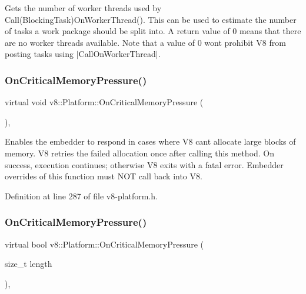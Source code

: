 Gets the number of worker threads used by Call(\+Blocking\+Task)On\+Worker\+Thread(). This can be used to estimate the number of tasks a work package should be split into. A return value of 0 means that there are no worker threads available. Note that a value of 0 won\textquotesingle{}t prohibit V8 from posting tasks using $\vert$\+Call\+On\+Worker\+Thread$\vert$. \mbox{\label{classv8_1_1Platform_a7ed41bddc1d1ebe51c55539198d0026e}} 
\subsubsection{\texorpdfstring{On\+Critical\+Memory\+Pressure()}{OnCriticalMemoryPressure()}\hspace{0.1cm}{\footnotesize\ttfamily [1/2]}}
{\footnotesize\ttfamily virtual void v8\+::\+Platform\+::\+On\+Critical\+Memory\+Pressure (\begin{DoxyParamCaption}{ }\end{DoxyParamCaption})\hspace{0.3cm}{\ttfamily [inline]}, {\ttfamily [virtual]}}

Enables the embedder to respond in cases where V8 can\textquotesingle{}t allocate large blocks of memory. V8 retries the failed allocation once after calling this method. On success, execution continues; otherwise V8 exits with a fatal error. Embedder overrides of this function must N\+OT call back into V8. 

Definition at line 287 of file v8-\/platform.\+h.

\mbox{\label{classv8_1_1Platform_a0de4b8a7bb8865ce65beb5afbaabe4cc}} 
\subsubsection{\texorpdfstring{On\+Critical\+Memory\+Pressure()}{OnCriticalMemoryPressure()}\hspace{0.1cm}{\footnotesize\ttfamily [2/2]}}
{\footnotesize\ttfamily virtual bool v8\+::\+Platform\+::\+On\+Critical\+Memory\+Pressure (\begin{DoxyParamCaption}\item[{size\+\_\+t}]{length }\end{DoxyParamCaption})\hspace{0.3cm}{\ttfamily [inline]}, {\ttfamily [virtual]}}

